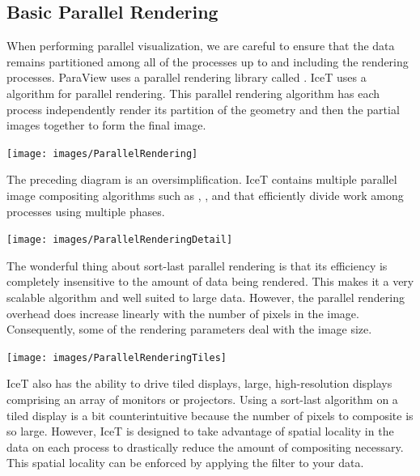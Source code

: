 \subsection{Basic Parallel Rendering}


When performing parallel visualization, we are careful to ensure that the
data remains partitioned among all of the processes up to and including
the rendering processes.  ParaView uses a parallel rendering library called
.  IceT uses a  algorithm for parallel
rendering.  This parallel rendering algorithm has each process
independently render its partition of the geometry and then
 the partial images together to form the final image.

\begin{inlinefig}
  \texttt{[image: images/ParallelRendering]}
\end{inlinefig}

The preceding diagram is an oversimplification.  IceT contains multiple
parallel image compositing algorithms such as ,
, and  that efficiently divide work
among processes using multiple phases.

\begin{inlinefig}
  \texttt{[image: images/ParallelRenderingDetail]}
\end{inlinefig}

The wonderful thing about sort-last parallel rendering is that its
efficiency is completely insensitive to the amount of data being rendered.
This makes it a very scalable algorithm and well suited to large data.
However, the parallel rendering overhead does increase linearly with the
number of pixels in the image.  Consequently, some of the rendering
parameters deal with the image size.

\begin{inlinefig}
  \texttt{[image: images/ParallelRenderingTiles]}
\end{inlinefig}

IceT also has the ability to drive tiled displays, large, high-resolution
displays comprising an array of monitors or projectors.  Using a sort-last
algorithm on a tiled display is a bit counterintuitive because the number
of pixels to composite is so large.  However, IceT is designed to take
advantage of spatial locality in the data on each process to drastically
reduce the amount of compositing necessary.  This spatial locality can be
enforced by applying the  filter to your data.

